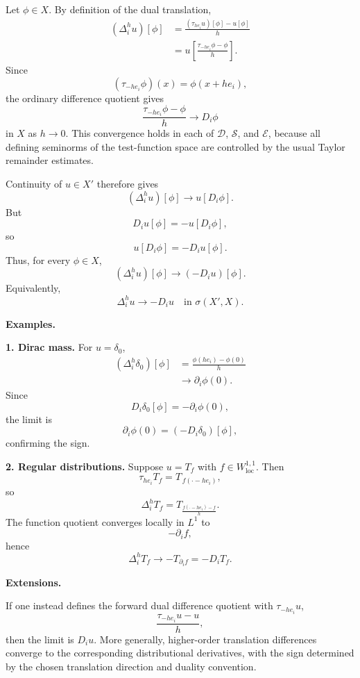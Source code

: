 \begin{solution}

Let \(\phi\in X\). By definition of the dual translation,
\[
\begin{aligned}
(\Delta_i^h u)[\phi]
&=
\frac{(\tau_{he_i}u)[\phi]-u[\phi]}{h}\\
&=
u\!\left[
\frac{\tau_{-he_i}\phi-\phi}{h}
\right].
\end{aligned}
\]
Since
\[
(\tau_{-he_i}\phi)(x)
=
\phi(x+he_i),
\]
the ordinary difference quotient gives
\[
\frac{\tau_{-he_i}\phi-\phi}{h}
\longrightarrow
D_i\phi
\]
in \(X\) as \(h\to0\). This convergence holds in each of
\(\mathcal D\), \(\mathcal S\), and \(\mathcal E\), because all defining
seminorms of the test-function space are controlled by the usual Taylor
remainder estimates.

Continuity of \(u\in X'\) therefore gives
\[
(\Delta_i^h u)[\phi]
\longrightarrow
u[D_i\phi].
\]
But
\[
D_i u[\phi]
=
-u[D_i\phi],
\]
so
\[
u[D_i\phi]
=
-D_i u[\phi].
\]
Thus, for every \(\phi\in X\),
\[
(\Delta_i^h u)[\phi]
\longrightarrow
(-D_i u)[\phi].
\]
Equivalently,
\[
\boxed{
\Delta_i^h u
\longrightarrow
-D_i u
\quad\text{in }\sigma(X',X).}
\]

\medskip
\noindent\textbf{Examples.}

\textbf{1. Dirac mass.}
For \(u=\delta_0\),
\[
\begin{aligned}
(\Delta_i^h\delta_0)[\phi]
&=
\frac{\phi(he_i)-\phi(0)}{h}\\
&\longrightarrow
\partial_i\phi(0).
\end{aligned}
\]
Since
\[
D_i\delta_0[\phi]
=
-\partial_i\phi(0),
\]
the limit is
\[
\partial_i\phi(0)
=
(-D_i\delta_0)[\phi],
\]
confirming the sign.

\textbf{2. Regular distributions.}
Suppose \(u=T_f\) with \(f\in W^{1,1}_{\mathrm{loc}}\). Then
\[
\tau_{he_i}T_f
=
T_{\,f(\cdot-he_i)},
\]
so
\[
\Delta_i^h T_f
=
T_{
\frac{f(\cdot-he_i)-f}{h}
}.
\]
The function quotient converges locally in \(L^1\) to
\[
-\partial_i f,
\]
hence
\[
\Delta_i^hT_f
\longrightarrow
-T_{\partial_i f}
=
-D_iT_f.
\]

\medskip
\noindent\textbf{Extensions.}

If one instead defines the forward dual difference quotient with
\(\tau_{-he_i}u\),
\[
\frac{\tau_{-he_i}u-u}{h},
\]
then the limit is \(D_i u\). More generally, higher-order translation
differences converge to the corresponding distributional derivatives,
with the sign determined by the chosen translation direction and duality
convention.
\end{solution}


